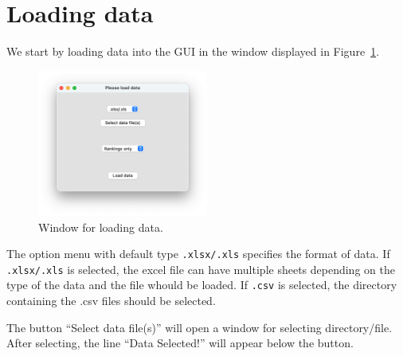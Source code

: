 \documentclass[a4paper,11pt]{memoir}
\begin{document}

\section{Loading data}
We start by loading data into the GUI in the window displayed in Figure~{\ref{fig:loading}}.

	\begin{figure}
		\begin{center}
			\includegraphics[width=0.5\textwidth]{art/loading.png}
			\caption{Window for loading data.}\label{fig:loading}
		\end{center}
	\end{figure}

The option menu with default type \texttt{.xlsx/.xls} specifies the format of data.
If \texttt{.xlsx/.xls} is selected, the excel file can have multiple sheets depending on the type of the data and the file whould be loaded.
If \texttt{.csv} is selected, the directory containing the .csv files should be selected.

The button ``Select data file(s)'' will open a window for selecting directory/file.
After selecting, 
the line ``Data Selected!'' will appear below the button.
\end{document}
